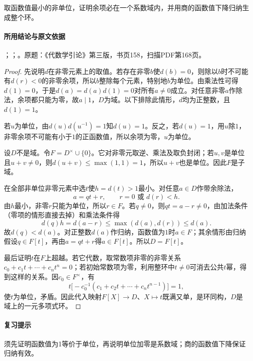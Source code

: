 取函数值最小的非单位，证明余项必在一个系数域内，并用商的函数值下降归纳生成整个环。

\paragraph{所用结论与原文依据}

；；。原题：《代数学引论》第三版，书页158，扫描PDF第168页。


\begin{proof}

先说明$d$在非零元素上的取值。若存在非零$b$使$d(b)=0$，则除以$b$时不可能有$d(r)<0$的非零余项，所以$b$整除每个元素，特别地$b$为单位。由乘法性可得$d(1)=0$，于是$d(a)=d(a)d(1)=0$对所有$a\ne0$成立。对任意非零$a$作除法，余项都只能为零，故$a\mid1$，$D$为域。以下排除此情形，$d$均为正整数，且$d(1)=1$。

若$u$为单位，由$d(u)d(u^{-1})=1$知$d(u)=1$。反之，若$d(u)=1$，用$u$除$1$，非零余项不可能有小于$1$的正函数值，所以余项为零，$u$为单位。

设$D$不是域。令$F=D^\times\cup\{0\}$。它对非零元取逆、乘法及取负封闭；若$u,v$是单位且$u+v\ne0$，则$d(u+v)\le\max(1,1)=1$，所以$u+v$也是单位。因此$F$是子域。

在全部非单位非零元素中选$t$使$h=d(t)>1$最小。对任意$a\in D$作带余除法，
\[
a=qt+r,\qquad r=0\text{ 或 }d(r)<h.
\]
由$h$最小，非零$r$只能为单位，所以$r\in F$。若$q\ne0$，则$qt=a-r\ne0$，由加法条件（零项的情形直接去掉）和乘法条件得
\[
d(q)h=d(a-r)\le\max(d(a),d(r))\le d(a).
\]
故$d(q)<d(a)$。对正整数$d(a)$作归纳，函数值为$1$时$a\in F$；其余情形由归纳假设$q\in F[t]$，再由$a=qt+r$得$a\in F[t]$。所以$D=F[t]$。

最后证明$t$在$F$上超越。若它代数，取常数项非零的非零关系$c_0+c_1t+\cdots+c_nt^n=0$；若初始常数项为零，利用整环中$t\ne0$可消去公共$t$幂，得到这样的关系。因$c_0\in F^\times$，有
\[
t\bigl[-c_0^{-1}(c_1+c_2t+\cdots+c_nt^{n-1})\bigr]=1,
\]
使$t$为单位，矛盾。因此代入映射$F[X]\to D$、$X\mapsto t$既满又单，是环同构，$D$是域上的一元多项式环。

\end{proof}

\paragraph{复习提示}

须先证明函数值为1等价于单位，再说明单位加零是系数域；商的函数值下降保证归纳有效。

